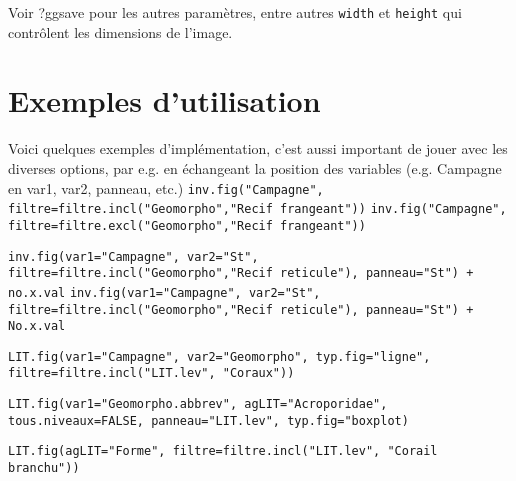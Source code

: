 \documentclass[12pt]{article}
\begin{document}
Voir ?ggsave pour les autres paramètres, entre autres \texttt{width} et \texttt{height} qui contrôlent les dimensions de l'image. 


\section{Exemples d'utilisation}

Voici quelques exemples d'implémentation, c’est aussi important de jouer avec les diverses options, par e.g. en échangeant la position des variables (e.g. Campagne en var1, var2, panneau, etc.)
\clearpage
\texttt{inv.fig("Campagne", filtre=filtre.incl("Geomorpho","Recif frangeant"))}
\clearpage
\texttt{inv.fig("Campagne", filtre=filtre.excl("Geomorpho","Recif frangeant"))}
\clearpage



\texttt{inv.fig(var1="Campagne", var2="St", filtre=filtre.incl("Geomorpho","Recif reticule"), panneau="St") + no.x.val}
\clearpage
\texttt{inv.fig(var1="Campagne", var2="St", filtre=filtre.incl("Geomorpho","Recif reticule"), panneau="St") + No.x.val}
\clearpage

\texttt{LIT.fig(var1="Campagne", var2="Geomorpho", typ.fig="ligne", filtre=filtre.incl("LIT.lev", "Coraux"))}
\clearpage

\texttt{LIT.fig(var1="Geomorpho.abbrev", agLIT="Acroporidae", tous.niveaux=FALSE, panneau="LIT.lev", typ.fig="boxplot)}
\clearpage

\texttt{LIT.fig(agLIT="Forme", filtre=filtre.incl("LIT.lev", "Corail branchu"))}
\clearpage
\end{document}
